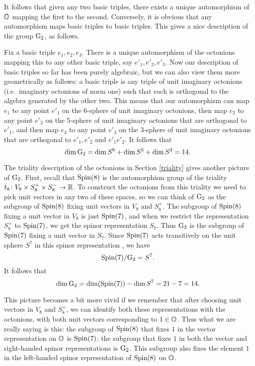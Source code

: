 It follows that given any two basic triples, there exists a unique   
automorphism of ${\mathbb O}$ mapping the first to the second.  Conversely, it is
obvious that any automorphism maps basic triples to basic triples. 
This gives a nice description of the group ${\rm G}_2$, as follows.   
    
Fix a basic triple $e_1,e_2,e_3$.   There is a unique automorphism   
of the octonions mapping this to any other basic triple, say   
$e'_1,e'_2,e'_3$.  Now our description of basic triples so far has   
been purely algebraic, but we can also view them more geometrically   
as follows: a basic triple is any triple of unit imaginary   
octonions (i.e.\ imaginary octonions of norm one) such that each is   
orthogonal to the algebra generated by the other two.  This means that   
our automorphism can map $e_1$ to any point $e'_1$ on the 6-sphere of   
unit imaginary octonions, then map $e_2$ to any point $e'_2$ on the   
5-sphere of unit imaginary octonions that are orthogonal to $e'_1$, and   
then map $e_3$ to any point $e'_3$ on the 3-sphere of unit imaginary   
octonions that are orthogonal to $e'_1,e'_2$ and $e'_1 e'_2$.  It follows   
that      
\[    \dim {\rm G}_2 = \dim S^6 + \dim S^5 + \dim S^3 = 14  .\]    
   
The triality description of the octonions in Section \ref{triality}   
gives another picture of ${\rm G}_2$.  First, recall that ${\rm Spin}(8)$ is the   
automorphism group of the triality $t_8 \colon V_8 \times S^+_8 \times  
S^-_8 \to {\mathbb R}$.  To construct the octonions from this triality we need to  
pick unit vectors in any two of these spaces, so we can think of ${\rm G}_2$  
as the subgroup of ${\rm Spin}(8)$ fixing unit vectors in $V_8$ and $S^+_8$.  
The subgroup of ${\rm Spin}(8)$ fixing a unit vector in $V_8$ is just   
${\rm Spin}(7)$, and when we restrict the representation $S^+_8$ to   
${\rm Spin}(7)$, we get the spinor representation $S_7$.  Thus ${\rm G}_2$ is the   
subgroup of ${\rm Spin}(7)$ fixing a unit vector in $S_7$.  Since ${\rm Spin}(7)$   
acts transitively on the unit sphere $S^7$ in this spinor representation
\cite{Adams}, we have 
\[          {\rm Spin}(7)/{\rm G}_2 = S^7 .  \]   
It follows that   
\[   \dim {\rm G}_2 = \dim ({\rm Spin}(7)) - \dim S^7 = 21 - 7 = 14  .\]   
   
This picture becomes a bit more vivid if we remember that after choosing
unit vectors in $V_8$ and $S^+_8$, we can identify both these
representations with the octonions, with both unit vectors corresponding
to $1 \in {\mathbb O}$.  Thus what we are really saying is this: the subgroup of
${\rm Spin}(8)$ that fixes $1$ in the vector representation on ${\mathbb O}$ is
${\rm Spin}(7)$; the subgroup that fixes $1$ in both the vector and
right-handed spinor representations is ${\rm G}_2$.  This subgroup also fixes
the element $1$ in the left-handed spinor representation of ${\rm Spin}(8)$
on ${\mathbb O}$.
   
